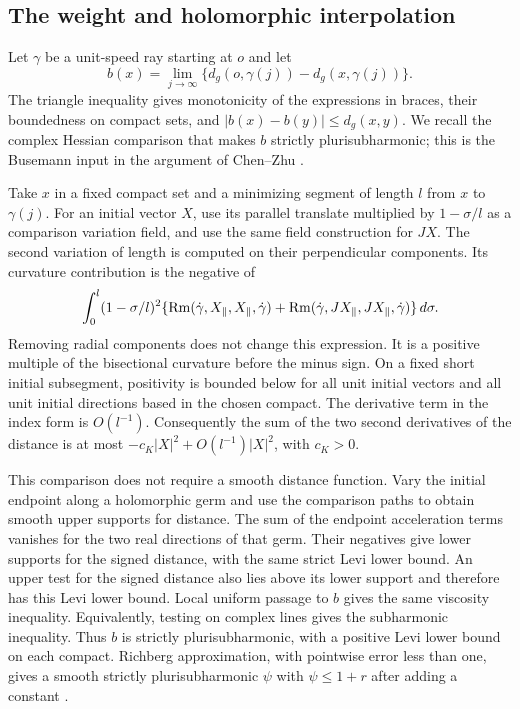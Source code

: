 \subsection{The weight and holomorphic interpolation}

Let $\gamma$ be a unit-speed ray starting at $o$ and let
\[
 b(x)=\lim_{j\to\infty}\{d_g(o,\gamma(j))-d_g(x,\gamma(j))\}.
\]
The triangle inequality gives monotonicity of the expressions in braces,
their boundedness on compact sets, and $|b(x)-b(y)|\le d_g(x,y)$.
We recall the complex Hessian comparison that makes $b$ strictly
plurisubharmonic; this is the Busemann input in the argument of
Chen--Zhu \cite[Section~2]{ChenZhu}.

Take $x$ in a fixed compact set and a minimizing segment of length $l$
from $x$ to $\gamma(j)$.  For an initial vector $X$, use its parallel
translate multiplied by $1-\sigma/l$ as a comparison variation field,
and use the same field construction for $JX$.  The second variation of
length is computed on their perpendicular components.  Its curvature
contribution is the negative of
\[
 \int_0^l(1-\sigma/l)^2
 \{\operatorname{Rm}(\dot\gamma,X_\parallel,X_\parallel,\dot\gamma)
   +\operatorname{Rm}(\dot\gamma,JX_\parallel,JX_\parallel,\dot\gamma)\}
 \,d\sigma.
\]
Removing radial components does not change this expression.  It is a
positive multiple of the bisectional curvature before the minus sign.
On a fixed short initial subsegment, positivity is bounded below for
all unit initial vectors and all unit initial directions based in the
chosen compact.  The derivative term in the index form is $O(l^{-1})$.
Consequently the sum of the two second derivatives of the distance is
at most $-c_K|X|^2+O(l^{-1})|X|^2$, with $c_K>0$.

This comparison does not require a smooth distance function.  Vary the
initial endpoint along a holomorphic germ and use the comparison paths
to obtain smooth upper supports for distance.  The sum of the endpoint
acceleration terms vanishes for the two real directions of that germ.
Their negatives give lower supports for the signed distance, with the
same strict Levi lower bound.  An upper test for the signed distance
also lies above its lower support and therefore has this Levi lower
bound.  Local uniform passage to $b$ gives the same viscosity inequality.
Equivalently, testing on complex lines gives the subharmonic
inequality.  Thus $b$ is strictly plurisubharmonic, with a positive Levi
lower bound on each compact.  Richberg approximation, with pointwise
error less than one, gives a smooth strictly plurisubharmonic $\psi$
with $\psi\le1+r$ after adding a constant
\cite{Richberg}\cite[Section~4, Corollary~2]{GreeneWu}.

